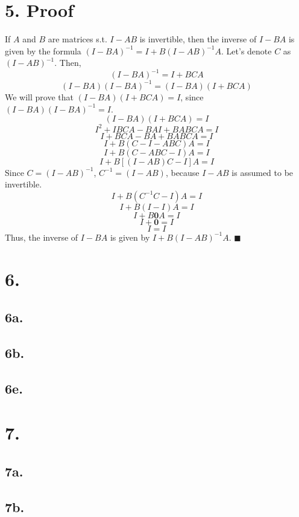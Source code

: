 \documentclass[11pt]{article}
\begin{document}
\section*{5. Proof}
If \(A\) and \(B\) are matrices s.t. \(I - AB\) is invertible, then the inverse of \(I - BA\) is given by the formula \((I - BA)^{-1} = I + B(I - AB)^{-1}A\).\hfill\break
Let's denote \(C\) as \((I - AB)^{-1}\). Then,
\[
    (I - BA)^{-1} = I + BCA
\]
\[
    (I - BA)(I - BA)^{-1} = (I - BA)(I + BCA)
\]
We will prove that \((I - BA)(I + BCA) = I\), since \((I - BA)(I - BA)^{-1} = I\).
\[
    (I - BA)(I + BCA) = I
\]
\[
    I^2 + IBCA - BAI + BABCA = I
\]
\[
    I + BCA - BA + BABCA = I
\]
\[
    I + B(C - I - ABC)A = I
\]
\[
    I + B(C - ABC - I)A = I
\]
\[
    I + B[(I - AB)C - I]A = I
\]
Since \(C = (I - AB)^{-1}\), \(C^{-1} = (I - AB)\), because \(I - AB\) is assumed to be invertible.
\[
    I + B(C^{-1}C - I)A = I
\]
\[
    I + B(I - I)A = I
\]
\[
    I + B\textbf{0}A = I
\]
\[
    I + \textbf{0} = I
\]
\[
    I = I
\]
Thus, the inverse of \(I - BA\) is given by \(I + B(I - AB)^{-1}A\). $\blacksquare$ \pagebreak

\section*{6.}
\subsection*{6a.}
\subsection*{6b.}
\subsection*{6e.}

\section*{7.}
\subsection*{7a.}
\subsection*{7b.}
\end{document}
